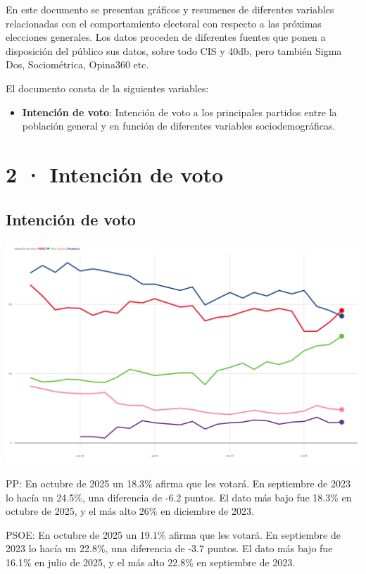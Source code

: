 \documentclass[
  letterpaper,
  DIV=11,
  numbers=noendperiod]{scrreprt}
\providecommand{\tightlist}{%
  \setlength{\itemsep}{0pt}\setlength{\parskip}{0pt}}
\begin{document}
En este documento se presentan gráficos y resumenes de diferentes
variables relacionadas con el comportamiento electoral con respecto a
las próximas elecciones generales. Los datos proceden de diferentes
fuentes que ponen a disposición del público sus datos, sobre todo CIS y
40db, pero también Sigma Dos, Sociométrica, Opina360 etc.

El documento consta de la siguientes variables:

\begin{itemize}
\tightlist
\item
  \textbf{Intención de voto}: Intención de voto a los principales
  partidos entre la población general y en función de diferentes
  variables sociodemográficas.
\end{itemize}

\part{2 · Intención de voto}

\chapter{Intención de voto}\label{intenciuxf3n-de-voto-1}

\includegraphics[width=8in,height=\textheight,keepaspectratio]{figures/p_idv_static.png}

{PP}: En octubre de 2025 un 18.3\% afirma que les votará. En septiembre
de 2023 lo hacía un 24.5\%, una diferencia de -6.2 puntos. El dato más
bajo fue 18.3\% en octubre de 2025, y el más alto 26\% en diciembre de
2023.

{PSOE}: En octubre de 2025 un 19.1\% afirma que les votará. En
septiembre de 2023 lo hacía un 22.8\%, una diferencia de -3.7 puntos. El
dato más bajo fue 16.1\% en julio de 2025, y el más alto 22.8\% en
septiembre de 2023.
\end{document}

